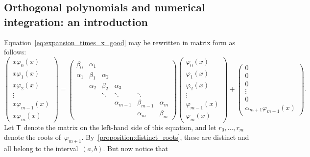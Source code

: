 \subsection{Orthogonal polynomials and numerical integration: an introduction~\moreinfo}
\label{sub:orthogonal_integration}
Equation~\eqref{eq:expansion_times_x_good} may be rewritten in matrix form as follows:
\[
    \begin{pmatrix}
        x \varphi_0(x) \\
        x \varphi_1(x) \\
        x \varphi_2(x) \\
        \vdots \\
        x \varphi_{m-1}(x) \\
        x \varphi_m(x)
    \end{pmatrix}
    =
    \begin{pmatrix}
        \beta_0 & \alpha_1 \\
        \alpha_1 & \beta_1 & \alpha_2 \\
                 & \alpha_2 & \beta_2 & \alpha_3 \\
                 & & \ddots & \ddots & \ddots \\
                 & & & \alpha_{m-1} & \beta_{m-1} & \alpha_m \\
                 & & & & \alpha_m & \beta_m
    \end{pmatrix}
    \begin{pmatrix}
        \varphi_0(x) \\
        \varphi_1(x) \\
        \varphi_2(x) \\
        \vdots \\
        \varphi_{m-1}(x) \\
        \varphi_m(x)
    \end{pmatrix}
    +
    \begin{pmatrix}
        0 \\
        0 \\
        0 \\
        \vdots \\
        0 \\
        \alpha_{m+1} \varphi_{m+1}(x)
    \end{pmatrix}.
\]
Let $\mathsf T$ denote the matrix on the left-hand side of this equation,
and let $r_0, \dotsc, r_{m}$ denote the roots of~$\varphi_{m+1}$.
By~\cref{proposition:distinct_roots},
these are distinct and all belong to the interval~$(a, b)$.
But now notice that
